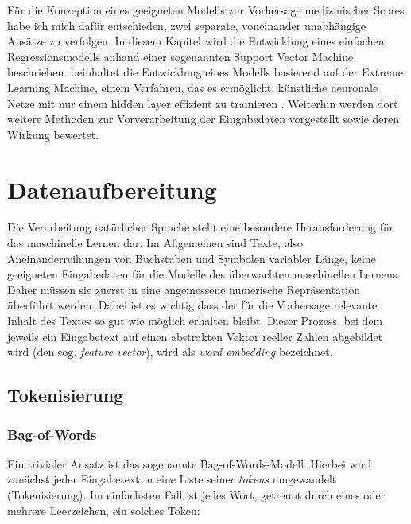 Für die Konzeption eines geeigneten Modells zur Vorhersage medizinischer Scores habe ich mich dafür entschieden, zwei separate, voneinander unabhängige Ansätze zu verfolgen. In diesem Kapitel wird die Entwicklung eines einfachen Regressionsmodells anhand einer sogenannten Support Vector Machine beschrieben.  beinhaltet die Entwicklung eines Modells basierend auf der Extreme Learning Machine, einem Verfahren, das es ermöglicht, künstliche neuronale Netze mit nur einem hidden layer effizient zu trainieren \citep{huangExtremeLearningMachine2006}. Weiterhin werden dort weitere Methoden zur Vorverarbeitung der Eingabedaten vorgestellt sowie deren Wirkung bewertet. 

\section{Datenaufbereitung}

Die Verarbeitung natürlicher Sprache stellt eine besondere Herausforderung für das maschinelle Lernen dar. Im Allgemeinen sind Texte, also Aneinanderreihungen von Buchstaben und Symbolen variabler Länge, keine geeigneten Eingabedaten für die Modelle des überwachten maschinellen Lernens. Daher müssen sie zuerst in eine angemessene numerische Repräsentation überführt werden. Dabei ist es wichtig dass der für die Vorhersage relevante Inhalt des Textes so gut wie möglich erhalten bleibt. Dieser Prozess, bei dem jeweils ein Eingabetext auf einen abstrakten Vektor reeller Zahlen abgebildet wird (den sog. \textit{feature vector}), wird als \textit{word embedding} bezeichnet. 

\subsection{Tokenisierung}

\subsubsection{Bag-of-Words}
Ein trivialer Ansatz ist das sogenannte Bag-of-Words-Modell. Hierbei wird zunächst jeder Eingabetext in eine Liste seiner \textit{tokens} umgewandelt (Tokenisierung). Im einfachsten Fall ist jedes Wort, getrennt durch eines oder mehrere Leerzeichen, ein solches Token:

\begin{figure}[H]
    \centering
    \caption{}
    \label{fig:tokenize_words}
\end{figure}

